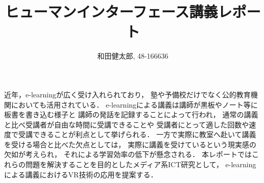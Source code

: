 \documentclass[letterpaper, 11 pt, conference, onecolumn]{ieeeconf}  %
\title{\LARGE \bf
ヒューマンインターフェース講義レポート
}
\author{和田健太郎, 48-166636}
\begin{document}
\maketitle
\thispagestyle{empty}
\pagestyle{empty}



近年，e-learningが広く受け入れられており，
塾や予備校だけでなく公的教育機関においても活用されている．
e-learningによる講義は講師が黒板やノート等に板書を書き込む様子と
講師の発話を記録することによって行われ，
通常の講義と比べ受講者が自由な時間に受講できることや
受講者にとって適した回数や速度で受講できることが利点として挙げられる．
一方で実際に教室へ赴いて講義を受ける場合と比べた欠点としては，
実際に講義を受けているという現実感の欠如が考えられ，
それによる学習効率の低下が懸念される．
本レポートではこれらの問題を解決することを目的としたメディア系ICT研究として，
e-learningによる講義におけるVR技術の応用を提案する．


% 

% 
% 
% 
% 
% 


% 
% 

% 
% 
\end{document}
